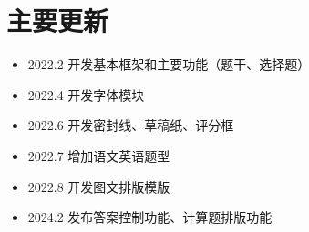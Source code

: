 
\section{主要更新}

\begin{itemize}
  \item 2022.2 开发基本框架和主要功能（题干、选择题）
  \item 2022.4 开发字体模块
  \item 2022.6 开发密封线、草稿纸、评分框
  \item 2022.7 增加语文英语题型
  \item 2022.8 开发图文排版模版
  \item 2024.2 发布答案控制功能、计算题排版功能
\end{itemize}
